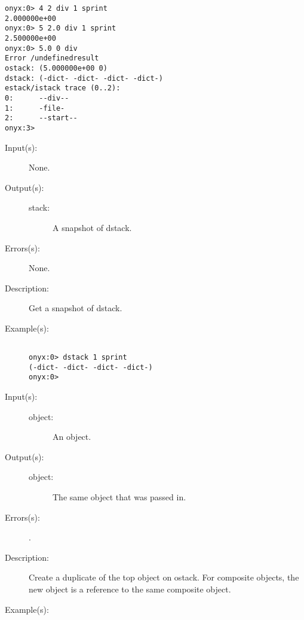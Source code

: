 \begin{description}
\begin{description}
\begin{verbatim}
onyx:0> 4 2 div 1 sprint
2.000000e+00
onyx:0> 5 2.0 div 1 sprint
2.500000e+00
onyx:0> 5.0 0 div
Error /undefinedresult
ostack: (5.000000e+00 0)
dstack: (-dict- -dict- -dict- -dict-)
estack/istack trace (0..2):
0:      --div--
1:      -file-
2:      --start--
onyx:3>
		\end{verbatim}
	\end{description}
\label{systemdict:dstack}
\item[{\onyxop{--}{dstack}{stack}}: ]
	\begin{description}\item[]
	\item[Input(s): ] None.
	\item[Output(s): ]
		\begin{description}\item[]
		\item[stack: ]
			A snapshot of dstack.
		\end{description}
	\item[Errors(s): ] None.
	\item[Description: ]
		Get a snapshot of dstack.
	\item[Example(s): ]\begin{verbatim}

onyx:0> dstack 1 sprint
(-dict- -dict- -dict- -dict-)
onyx:0>
		\end{verbatim}
	\end{description}
\label{systemdict:dup}
\item[{\onyxop{object}{dup}{object object}}: ]
	\begin{description}\item[]
	\item[Input(s): ]
		\begin{description}\item[]
		\item[object: ]
			An object.
		\end{description}
	\item[Output(s): ]
		\begin{description}\item[]
		\item[object: ]
			The same object that was passed in.
		\end{description}
	\item[Errors(s): ]
		\begin{description}\item[]
		\item[.]
		\end{description}
	\item[Description: ]
		Create a duplicate of the top object on ostack.  For composite
		objects, the new object is a reference to the same composite
		object.
	\item[Example(s): ]\begin{verbatim}


\end{verbatim}
\end{description}
\end{description}
